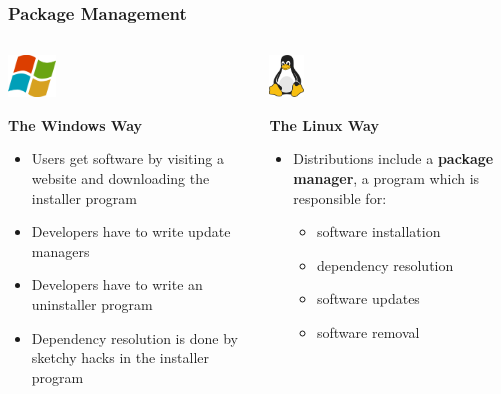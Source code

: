 \documentclass{lug}
\begin{document}
\begin{frame}
    \frametitle{Package Management}
    \vglue-20pt
    \begin{columns}[T]
        \begin{column}{0.5\textwidth}
            \begin{center}
                \includegraphics[height=3em]{graphics/mswindows}\par
                \textbf{The Windows Way}
            \end{center}
            \vglue-10pt
            \small
            \begin{itemize}
                \item Users get software by visiting a website and downloading
                    the installer program
                \item Developers have to write update managers
                \item Developers have to write an uninstaller program
                \item Dependency resolution is done by sketchy hacks in the
                    installer program
            \end{itemize}
        \end{column}
        \begin{column}{0.5\textwidth}
            \begin{center}
                \includegraphics[height=3em]{graphics/TuxFlat}\par
                \textbf{The Linux Way}
            \end{center}
            \vglue-10pt
            \small
            \begin{itemize}
                \item Distributions include a \textbf{package manager}, a
                    program which is responsible for:
                    \begin{itemize}
                        \item software installation
                        \item dependency resolution
                        \item software updates
                        \item software removal
                    \end{itemize}
            \end{itemize}
        \end{column}
    \end{columns}
\end{frame}
\end{document}
